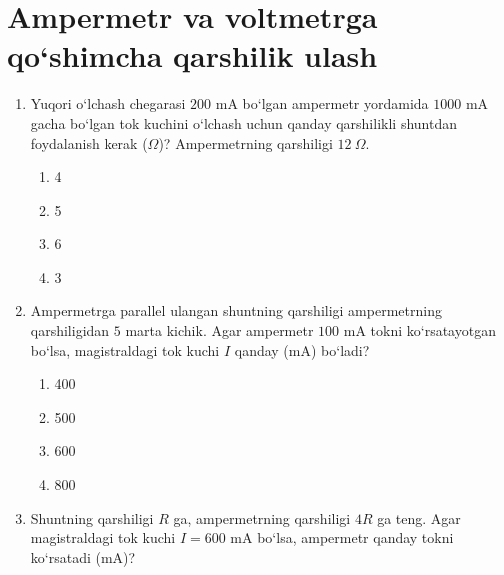\section{Ampermetr va voltmetrga qo`shimcha qarshilik ulash}




\begin{enumerate}

\item Yuqori o‘lchash chegarasi $200$ mA bo‘lgan ampermetr yordamida $1000$ mA gacha bo‘lgan tok kuchini o‘lchash uchun qanday qarshilikli shuntdan foydalanish kerak ($\Omega$)? Ampermetrning qarshiligi $12~\Omega$.
\begin{enumerate}[label=\Alph*)]
\item 4
\item 5
\item 6
\item 3

\end{enumerate}

\item Ampermetrga parallel ulangan shuntning qarshiligi ampermetrning qarshiligidan $5$ marta kichik. Agar ampermetr $100$ mA tokni ko‘rsatayotgan bo‘lsa, magistraldagi tok kuchi $I$ qanday (mA) bo‘ladi?


\begin{enumerate}[label=\Alph*)]
\item 400
\item 500
\item 600
\item 800

\end{enumerate}

\item Shuntning qarshiligi $R$ ga, ampermetrning qarshiligi $4R$ ga teng. Agar magistraldagi tok kuchi $I=600$ mA bo‘lsa, ampermetr qanday tokni ko‘rsatadi (mA)?

\end{enumerate}
